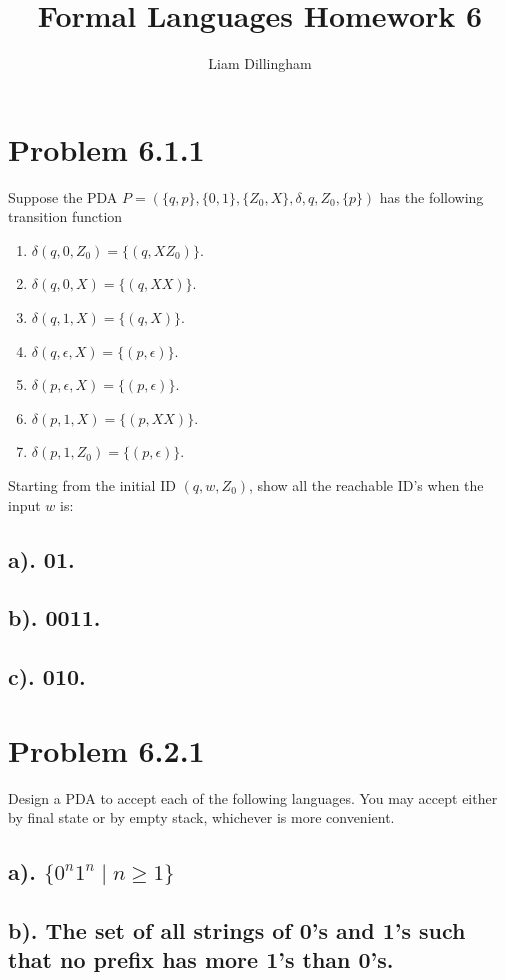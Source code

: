 \documentclass[20pt]{article} %
\title{Formal Languages Homework 6}
\author{Liam Dillingham}
\begin{document}
\maketitle

\section{Problem 6.1.1}
Suppose the PDA $\!P = (\{q, p\}, \{0,1\}, \{Z_0,X\}, \delta, q , Z_0, \{p\})$ has the following transition function
\begin{enumerate}
\item $\delta(q, 0, Z_0) = \{(q, XZ_0)\}$.
\item $\delta(q, 0, X) = \{(q, XX)\}$.
\item $\delta(q, 1, X) = \{(q, X)\}$.
\item $\delta(q, \epsilon, X) = \{(p, \epsilon)\}$.
\item $\delta(p, \epsilon, X) = \{(p, \epsilon)\}$.
\item $\delta(p, 1, X) = \{(p, XX)\}$.
\item $\delta(p, 1, Z_0) = \{(p, \epsilon)\}$.
\end{enumerate}
Starting from the initial ID $(q, w, Z_0)$, show all the reachable ID's when the input $w$ is:
\subsection{a). 01.}
\subsection{b). 0011.}
\subsection{c). 010.}

\section{Problem 6.2.1}
Design a PDA to accept each of the following languages.  You may accept either by final state or by empty stack, whichever is more convenient.  
\subsection{a). $\{0^{n}1^{n} \mid n \geq 1\}$}
\subsection{b). The set of all strings of 0's and 1's such that no prefix has more 1's than 0's.}
\end{document}
